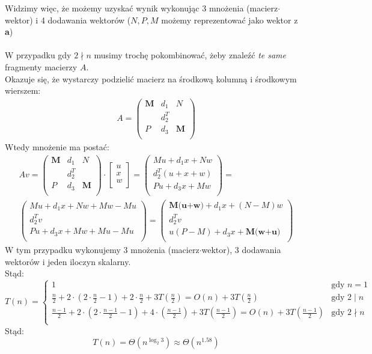 \documentclass{article}
\begin{document}
Widzimy więc, że możemy uzyskać wynik wykonując 3 mnożenia (macierz$\cdot$wektor) i 4 dodawania wektorów ($N,P,M$ możemy reprezentować jako wektor z \textbf{a})\\\\
W przypadku gdy $2 \nmid n$ musimy trochę pokombinować, żeby znaleźć \textit{te same} fragmenty macierzy $A$.\\
Okazuje się, że wystarczy podzielić macierz na środkową kolumną i środkowym wierszem:
\begin{align*}
A =
\begin{pmatrix}
\textbf{M} & d_1 & N\\
& d_2^T &\\
P & d_3 & \textbf{M}\\
\end{pmatrix}
\end{align*}
Wtedy mnożenie ma postać:
\begin{align*}
Av =
\begin{pmatrix}
\textbf{M} & d_1 & N\\
& d_2^T &\\
P & d_3 & \textbf{M}\\
\end{pmatrix} \cdot
\begin{bmatrix}
u\\
x\\
w\\
\end{bmatrix} =
\begin{pmatrix}
Mu + d_1x + Nw\\
d_2^T(u+x+w)\\
Pu + d_3x + Mw\\
\end{pmatrix}
=\\
\begin{pmatrix}
Mu + d_1x + Nw + Mw - Mu\\
d_2^Tv\\
Pu + d_3x + Mw + Mu - Mu\\
\end{pmatrix}=
\begin{pmatrix}
\textbf{M(u+w)} + d_1x + (N-M)w\\
d_2^Tv\\
u(P-M) + d_3x + \textbf{M(w+u)}\\
\end{pmatrix}
\end{align*}
W tym przypadku wykonujemy 3 mnożenia (macierz$\cdot$wektor), 3 dodawania wektorów i jeden iloczyn skalarny.\\
\clearpage
Stąd:
$$
T(n)=
\begin{cases}
1 & \text{gdy $n=1$}\\
\frac{n}{2} + 2\cdot(2\cdot\frac{n}{2}-1) + 2\cdot\frac{n}{2} + 3T(\frac n 2) = O(n) + 3T(\frac n 2)& \text{gdy $2\mid n$}\\
\frac{n-1}{2} + 2\cdot(2\cdot\frac{n-1}{2}-1) + 4\cdot(\frac{n-1}{2})+ 3T(\frac {n-1} 2) = O(n) + 3T(\frac {n-1} 2)& \text{gdy $2\nmid n$}\\
\end{cases}
$$
Stąd:
$$
T(n) = \Theta(n^{\log_2{3}}) \approx \Theta(n^{1.58})
$$
\clearpage
\end{document}
